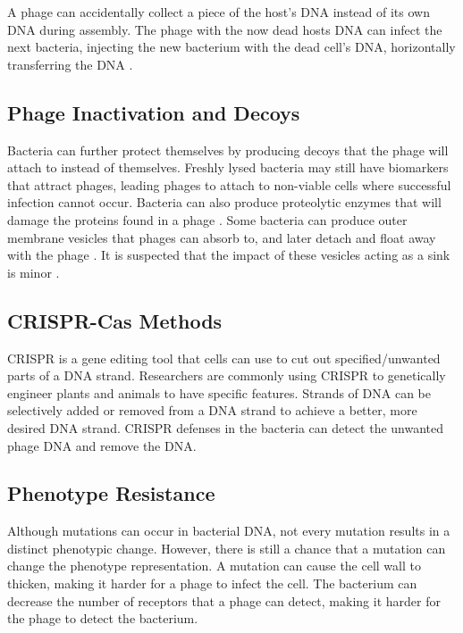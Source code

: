 A phage can accidentally collect a piece of the host's DNA instead of its own DNA during assembly. 
The phage with the now dead hosts DNA can infect the next bacteria, injecting the new bacterium with the dead cell's DNA, horizontally transferring the DNA \cite{tamangHorizontalGeneTransfer2023, kasmanBacteriophages2025}. 

\subsection{Phage Inactivation and Decoys}
Bacteria can further protect themselves by producing decoys that the phage will attach to instead of themselves. 
Freshly lysed bacteria may still have biomarkers that attract phages, leading phages to attach to non-viable cells where successful infection cannot occur.
Bacteria can also produce proteolytic enzymes that will damage the proteins found in a phage \cite{tanQuorumSensingDetermines2015}. 
Some bacteria can produce outer membrane vesicles that phages can absorb to, and later detach and float away with the phage \cite{rabinovitchBacterialDebrisEcological2003}. 
It is suspected that the impact of these vesicles acting as a sink is minor \cite{bullPhageBacterialDynamicsSpatial2018}. 


\subsection{CRISPR-Cas Methods}
CRISPR is a gene editing tool that cells can use to cut out specified/unwanted parts of a DNA strand. 
Researchers are commonly using CRISPR to genetically engineer plants and animals to have specific features. 
Strands of DNA can be selectively added or removed from a DNA strand to achieve a better, more desired DNA strand. 
CRISPR defenses in the bacteria can detect the unwanted phage DNA and remove the DNA. 

\subsection{Phenotype Resistance}
Although mutations can occur in bacterial DNA, not every mutation results in a distinct phenotypic change.
However, there is still a chance that a mutation can change the phenotype representation. 
A mutation can cause the cell wall to thicken, making it harder for a phage to infect the cell. 
The bacterium can decrease the number of receptors that a phage can detect, making it harder for the phage to detect the bacterium. 

